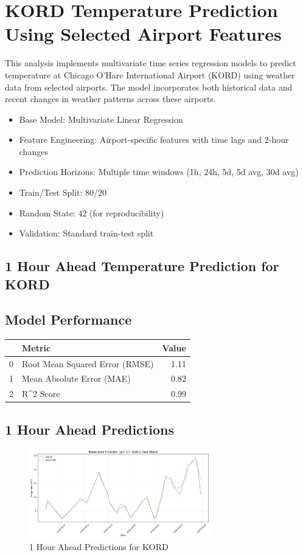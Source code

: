 \section{KORD Temperature Prediction Using Selected Airport Features}
This analysis implements multivariate time series regression models to predict temperature at Chicago O'Hare International Airport (KORD) using weather data from selected airports. The model incorporates both historical data and recent changes in weather patterns across these airports.\n\begin{itemize}
  \item Base Model: Multivariate Linear Regression
  \item Feature Engineering: Airport-specific features with time lags and 2-hour changes
  \item Prediction Horizons: Multiple time windows (1h, 24h, 5d, 5d avg, 30d avg)
  \item Train/Test Split: 80/20
  \item Random State: 42 (for reproducibility)
  \item Validation: Standard train-test split
\end{itemize}

\subsection{1 Hour Ahead Temperature Prediction for KORD}
\subsection{Model Performance}
\begin{tabular}{llr}
\toprule
 & Metric & Value \\
\midrule
0 & Root Mean Squared Error (RMSE) & 1.11 \\
1 & Mean Absolute Error (MAE) & 0.82 \\
2 & R^2 Score & 0.99 \\
\bottomrule
\end{tabular}

\subsection{1 Hour Ahead Predictions}
\begin{figure}[htbp]
\centering
\includegraphics[width=0.7\textwidth]{1-0-linear_temp_shift_results.png}
\caption{1 Hour Ahead Predictions for KORD}
\label{fig:1_hour_ahead_pred}
\end{figure}

